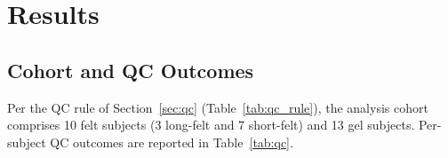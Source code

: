 \documentclass[10pt,a4paper]{article}
\begin{document}
\section{Results}

\subsection{Cohort and QC Outcomes}\label{sec:cohort_qc}
Per the QC rule of Section~\ref{sec:qc} (Table~\ref{tab:qc_rule}), the analysis cohort comprises 10 felt subjects (3 long-felt and 7 short-felt) and 13 gel subjects. Per-subject QC outcomes are reported in Table~\ref{tab:qc}.

\begin{table}[H]
\caption{Per-subject QC outcomes. Subjects are de-identified with cohort-prefixed codes (LF = long felt; SF = short felt; G = gel) assigned alphabetically by raw recording name. Status: PASS if no flags trigger; WARN if exactly one soft flag triggers (clip $2$--$5$\%, or mean tEEG SNR in $[-1,0)$~dB); FAIL if any hard threshold is breached (clip $>5\%$, SNR $<-1$~dB, $<2$ epochs of either condition, or two simultaneous WARN flags).}
\label{tab:qc}
\centering\footnotesize
\setlength{\tabcolsep}{4pt}
\end{table}
\end{document}
